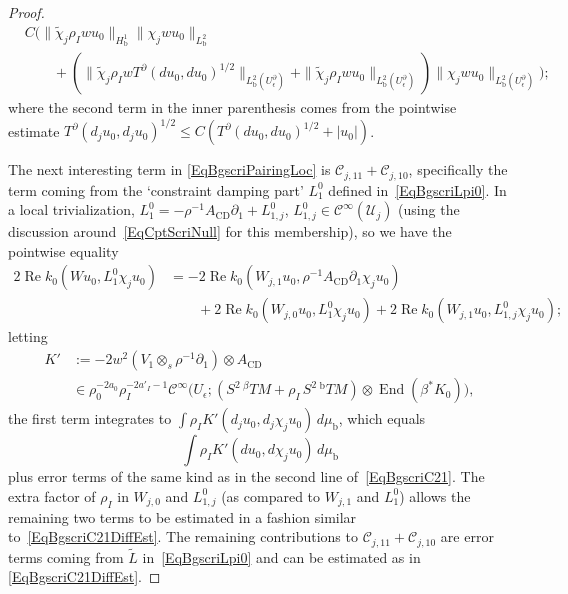 \documentclass[reqno,11pt,letterpaper]{amsart}
\numberwithin{equation}{section}
\numberwithin{figure}{section}
\theoremstyle{definition}
\theoremstyle{remark}
\newcommand{\mc}{\mathcal}
\newcommand{\cC}{\mc C}
\newcommand{\cU}{\mc U}
\newcommand{\End}{\operatorname{End}}
\renewcommand{\Re}{\operatorname{Re}}
\newcommand{\CD}{{\mathrm{CD}}}
\newcommand{\eps}{\epsilon}
\newcommand{\pa}{\partial}
\newcommand{\wt}{\widetilde}
\newcommand{\bop}{{\mathrm{b}}}
\newcommand{\Tb}{{}^{\bop}T}
\newcommand{\Tbeta}{{}^{\beta}T}
\newcommand{\CI}{\cC^\infty}
\newcommand{\Hb}{H_{\bop}}
\begin{document}
\begin{proof}
  \begin{equation}
  \label{EqBgscriC21DiffEst2}
  \begin{split}
    &C\bigl( \| \wt\chi_j \rho_I w u_0 \|_{\Hb^1} \| \chi_j w u_0 \|_{L^2_\bop} \\
      &\qquad + (\| \wt\chi_j\rho_I w T^\pa(d u_0,d u_0)^{1/2} \|_{L^2_\bop(U_\eps^\pa)}+\|\wt\chi_j\rho_I w u_0\|_{L^2_\bop(U_\eps^\pa)}) \| \chi_j w u_0\|_{L^2_\bop(U_\eps^\pa)} \bigr);
  \end{split}
  \end{equation}
  where the second term in the inner parenthesis comes from the pointwise estimate $T^\pa(d_j u_0,\allowbreak d_j u_0)^{1/2}\leq C(T^\pa(d u_0,d u_0)^{1/2}+|u_0|)$.
  
  The next interesting term in \eqref{EqBgscriPairingLoc} is $\cC_{j,1 1}+\cC_{j,1 0}$, specifically the term coming from the `constraint damping part' $L^0_1$ defined in~\eqref{EqBgscriLpi0}. In a local trivialization, $L^0_1=-\rho^{-1}A_\CD\pa_1+L^0_{1,j}$, $L^0_{1,j}\in\CI(\cU_j)$ (using the discussion around~\eqref{EqCptScriNull} for this membership), so we have the pointwise equality
  \begin{align*}
    2\Re k_0(W u_0,L_1^0\chi_j u_0) &= -2\Re k_0(W_{j,1}u_0,\rho^{-1}A_\CD\pa_1 \chi_j u_0) \\
      &\qquad + 2\Re k_0(W_{j,0}u_0,L_1^0\chi_j u_0) + 2\Re k_0(W_{j,1} u_0,L^0_{1,j}\chi_j u_0);
  \end{align*}
  letting
  \begin{align*}
    K' &:= -2 w^2 (V_1\otimes_s \rho^{-1}\pa_1) \otimes A_\CD \\
       &\in \rho_0^{-2 a_0}\rho_I^{-2 a'_I-1}\CI\bigl(U_\eps; (S^2\,\Tbeta M+\rho_I\,S^2\,\Tb M)\otimes\End(\beta^*K_0)\bigr),
  \end{align*}
  the first term integrates to $\int \rho_I K'(d_j u_0,d_j\chi_j u_0)\,d\mu_\bop$, which equals
  \begin{equation}
  \label{EqBgscriC11Main}
    \int\rho_I K'(d u_0,d\chi_j u_0)\,d\mu_\bop
  \end{equation}
  plus error terms of the same kind as in the second line of~\eqref{EqBgscriC21}. The extra factor of $\rho_I$ in $W_{j,0}$ and $L^0_{1,j}$ (as compared to $W_{j,1}$ and $L^0_1$) allows the remaining two terms to be estimated in a fashion similar to~\eqref{EqBgscriC21DiffEst}. The remaining contributions to $\cC_{j,1 1}+\cC_{j,1 0}$ are error terms coming from $\wt L$ in~\eqref{EqBgscriLpi0} and can be estimated as in \eqref{EqBgscriC21DiffEst}.


\end{proof}
\end{document}
